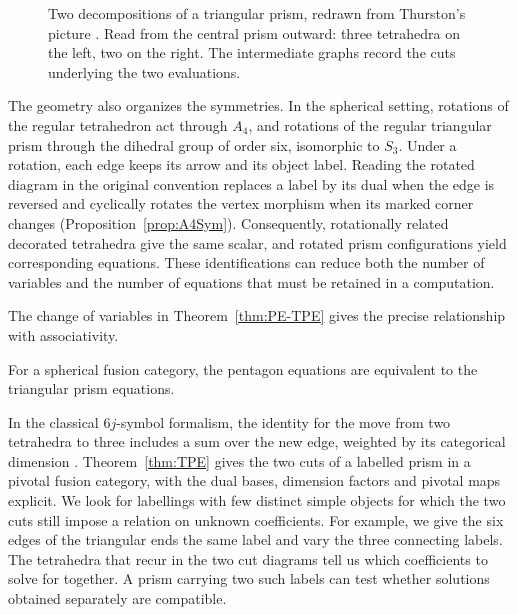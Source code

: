 \documentclass{amsart}
\begin{document}
\begin{figure}[ht]
{}
\caption{Two decompositions of a triangular prism, redrawn from Thurston's picture \cite[Figure~4]{thu}. Read from the central prism outward: three tetrahedra on the left, two on the right. The intermediate graphs record the cuts underlying the two evaluations.}
\label{fig:thurston-prism}
\end{figure}

The geometry also organizes the symmetries. In the spherical setting, rotations of the regular tetrahedron act through $A_4$, and rotations of the regular triangular prism through the dihedral group of order six, isomorphic to $S_3$. Under a rotation, each edge keeps its arrow and its object label. Reading the rotated diagram in the original convention replaces a label by its dual when the edge is reversed and cyclically rotates the vertex morphism when its marked corner changes (Proposition~\ref{prop:A4Sym}). Consequently, rotationally related decorated tetrahedra give the same scalar, and rotated prism configurations yield corresponding equations. These identifications can reduce both the number of variables and the number of equations that must be retained in a computation.

The change of variables in Theorem~\ref{thm:PE-TPE} gives the precise relationship with associativity.

\begin{theorem}\label{thm:main}
For a spherical fusion category, the pentagon equations are equivalent to the triangular prism equations.
\end{theorem}

In the classical $6j$-symbol formalism, the identity for the move from two tetrahedra to three includes a sum over the new edge, weighted by its categorical dimension \cite[\S3, Proposition~5.2 and Lemma~5.4]{BW96}. Theorem~\ref{thm:TPE} gives the two cuts of a labelled prism in a pivotal fusion category, with the dual bases, dimension factors and pivotal maps explicit. We look for labellings with few distinct simple objects for which the two cuts still impose a relation on unknown coefficients. For example, we give the six edges of the triangular ends the same label and vary the three connecting labels. The tetrahedra that recur in the two cut diagrams tell us which coefficients to solve for together. A prism carrying two such labels can test whether solutions obtained separately are compatible.
\end{document}
